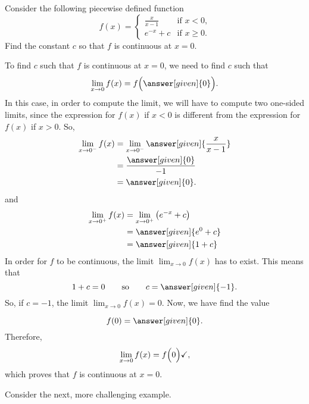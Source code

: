 \documentclass{ximera}
\begin{document}
\begin{example}
Consider the following piecewise defined function
\[
f(x) = 
\begin{cases}
  \frac{x}{x-1} &\text{if $x<0$,}\\
  e^{-x} + c &\text{if $x\ge 0$}.
\end{cases}
\]
Find the constant $c$ so that $f$ is continuous at $x=0$.
\begin{explanation}
  To find $c$ such that $f$ is continuous at $x=0$, we need to find
  $c$ such that
    \[
 \lim_{x\to 0} f(x) = f\Bigl(\answer[given]{0}\Bigr).
  \]
  In this case, in order to compute the limit, we will have to compute two one-sided limits, since the expression for  $f(x)$ if $x<0$ is  different from the expression for $f(x)$ if $x>0$.
  So,
  \begin{align*}
    \lim_{x\to 0^-} f(x) &= \lim_{x\to 0^-}\answer[given]{\frac{x}{x-1}}\\
    &= \frac{\answer[given]{0}}{-1}\\
    &=\answer[given]{0}.
  \end{align*}
and
  \begin{align*}
    \lim_{x\to 0^+} f(x) &= \lim_{x\to 0^+}\left(e^{-x}+c\right)\\
    &= \answer[given]{e^0 + c}\\
    &= \answer[given]{1+ c}
  \end{align*}
  In order for $f$ to be continuous, the limit $ \lim_{x\to 0} f(x)$ has to exist. This means that
  \[
  1 + c = 0\qquad\text{so}\qquad c = \answer[given]{-1}.
  \]
  So, if $c=-1$, the limit $ \lim_{x\to 0} f(x)=0$. Now, we have find the value

\[
  f(0) = \answer[given]{0}.
  \]
  Therefore,
   \[
 \lim_{x\to 0} f(x) = f\Bigl(0\Bigr)\checkmark,
  \]
  which proves that $f$ is continuous at $x=0$.
\end{explanation}
\end{example}


Consider the next, more challenging example.
\end{document}
